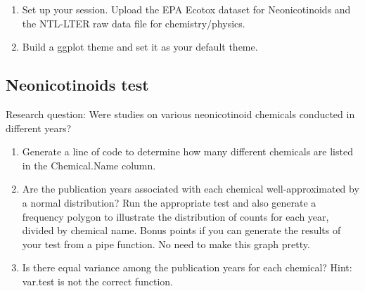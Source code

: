 \documentclass[]{article}
\newenvironment{Shaded}{\begin{snugshade}}{\end{snugshade}}
\newcommand{\KeywordTok}[1]{\textcolor[rgb]{0.13,0.29,0.53}{\textbf{#1}}}
\newcommand{\DataTypeTok}[1]{\textcolor[rgb]{0.13,0.29,0.53}{#1}}
\newcommand{\DecValTok}[1]{\textcolor[rgb]{0.00,0.00,0.81}{#1}}
\newcommand{\StringTok}[1]{\textcolor[rgb]{0.31,0.60,0.02}{#1}}
\newcommand{\CommentTok}[1]{\textcolor[rgb]{0.56,0.35,0.01}{\textit{#1}}}
\newcommand{\OperatorTok}[1]{\textcolor[rgb]{0.81,0.36,0.00}{\textbf{#1}}}
\newcommand{\NormalTok}[1]{#1}
\begin{document}
\begin{enumerate}
\def\labelenumi{\arabic{enumi}.}
\item
  Set up your session. Upload the EPA Ecotox dataset for Neonicotinoids
  and the NTL-LTER raw data file for chemistry/physics.
\item
  Build a ggplot theme and set it as your default theme.
\end{enumerate}

\begin{Shaded}
\end{Shaded}

\subsection{Neonicotinoids test}\label{neonicotinoids-test}

Research question: Were studies on various neonicotinoid chemicals
conducted in different years?

\begin{enumerate}
\def\labelenumi{\arabic{enumi}.}
\setcounter{enumi}{2}
\item
  Generate a line of code to determine how many different chemicals are
  listed in the Chemical.Name column.
\item
  Are the publication years associated with each chemical
  well-approximated by a normal distribution? Run the appropriate test
  and also generate a frequency polygon to illustrate the distribution
  of counts for each year, divided by chemical name. Bonus points if you
  can generate the results of your test from a pipe function. No need to
  make this graph pretty.
\item
  Is there equal variance among the publication years for each chemical?
  Hint: var.test is not the correct function.
\end{enumerate}
\end{document}
